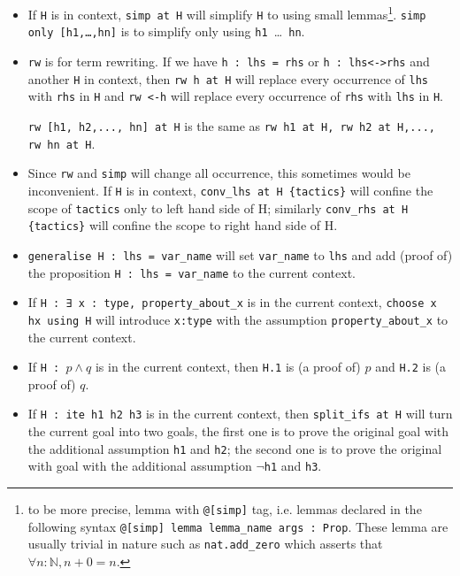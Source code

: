 \documentclass{report}
\theoremstyle{definition}
\begin{document}
\begin{itemize}
\begin{itemize}
    {\tt \small replace H : some\_proposition} will add one more goal of proving {\tt \small some\_proposition} and then replace {\tt \small H} to the proposition proven.
    \item If {\tt \small H} is in context, {\tt \small simp at H} will simplify {\tt \small H} to using small lemmas\footnote{to be more precise, lemma with {\tt \small @[simp]} tag, i.e. lemmas declared in the following syntax {\tt \small @[simp] lemma lemma\_name args : Prop}. These lemma are usually trivial in nature such as {\tt \small nat.add\_zero} which asserts that $\forall n:\mathbb N, n + 0 = n$.}.
    {\tt \small simp only [h1,\dots,hn]} is to simplify only using {\tt \small h1 }\dots{\tt \small{ hn}}.
    \item {\tt \small rw} is for term rewriting. If we have {\tt \small h : lhs = rhs} or {\tt \small h : lhs<->rhs} and another {\tt \small H} in context, then {\tt \small rw h at H} will replace every occurrence of {\tt \small lhs} with {\tt \small rhs} in {\tt \small H} and {\tt \small rw <-h} will replace every occurrence of {\tt \small rhs} with {\tt \small lhs} in {\tt \small H}.
  
    {\tt \small rw [h1, h2,..., hn] at H} is the same as {\tt \small rw h1 at H, rw h2 at H,..., rw hn at H}.
    
    \item Since {\tt \small rw} and {\tt \small simp} will change all occurrence, this sometimes would be inconvenient. If {\tt \small H} is in context, {\tt \small conv\_lhs at H \{tactics\}} will confine the scope of {\tt \small tactics} only to left hand side of H; similarly {\tt \small conv\_rhs at H \{tactics\}} will confine the scope to right hand side of H.

    \item {\tt \small generalise H : lhs = var\_name} will set {\tt \small var\_name} to {\tt \small lhs} and add (proof of) the proposition {\tt \small H : lhs = var\_name} to the current context.
    \item If {\tt \small H : ∃ x : type, property\_about\_x} is in the current context, {\tt \small choose x hx using H} will introduce {\tt \small x:type} with the assumption {\tt \small property\_about\_x} to the current context. 
    \item If {\tt \small H : $p\land q$} is in the current context, then {\tt \small H.1} is (a proof of) $p$ and {\tt \small H.2} is (a proof of) $q$.
    \item If {\tt \small H : ite h1 h2 h3} is in the current context, then {\tt \small split\_ifs at H} will turn the current goal into two goals, the first one is to prove the original goal with the additional assumption {\tt \small h1} and {\tt \small h2}; the second one is to prove the original with goal with the additional assumption {\tt \small $\neg$h1} and {\tt \small h3}.
  \end{itemize}


\end{itemize}
\end{document}
